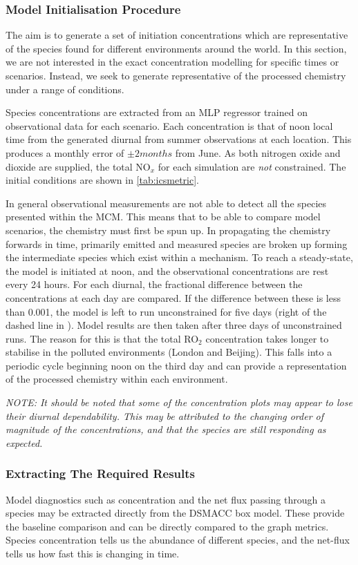 \subsubsection{Model Initialisation Procedure}
The aim is to generate a set of initiation concentrations which are representative of the species found for different environments around the world. In this section, we are not interested in the exact concentration modelling for specific times or scenarios. Instead, we seek to generate representative of the processed chemistry under a range of conditions.

Species concentrations are extracted from an MLP regressor trained on observational data for each scenario. Each concentration is that of noon local time from the generated diurnal from summer observations at each location. This produces a monthly error of $\pm 2 months$ from June. As both nitrogen oxide and dioxide are supplied, the total NO$_x$ for each simulation are \emph{not} constrained. The initial conditions are shown in \autoref{tab:icsmetric}.

In general observational measurements are not able to detect all the species presented within the MCM. This means that to be able to compare model scenarios, the chemistry must first be spun up. In propagating the chemistry forwards in time, primarily emitted and measured species are broken up forming the intermediate species which exist within a mechanism. To reach a steady-state, the model is initiated at noon, and the observational concentrations are rest every 24 hours. For each diurnal, the fractional difference between the concentrations at each day are compared. If the difference between these is less than 0.001, the model is left to run unconstrained for five days (right of the dashed line in ). Model results are then taken after three days of unconstrained runs. The reason for this is that the total RO$_2$ concentration takes longer to stabilise in the polluted environments (London and Beijing). This falls into a periodic cycle beginning noon on the third day and can provide a representation of the processed chemistry within each environment.

\textit{NOTE: It should be noted that some of the concentration plots may appear to lose their diurnal dependability. This may be attributed to the changing order of magnitude of the concentrations, and that the species are still responding as expected. }

\subsubsection{Extracting The Required Results}
Model diagnostics such as concentration and the net flux passing through a species may be extracted directly from the DSMACC box model. These provide the baseline comparison and can be directly compared to the graph metrics. Species concentration tells us the abundance of different species, and the net-flux tells us how fast this is changing in time.

